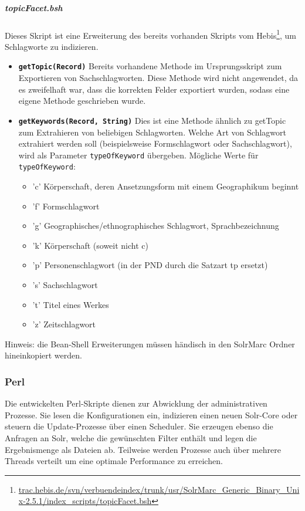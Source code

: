 \documentclass[10pt]{article}
\begin{document}
\subparagraph{topicFacet.bsh}
\label{sec:subpara:topicFacet}
Dieses Skript ist eine Erweiterung des bereits vorhanden Skripts vom Hebis\footnote{\url{trac.hebis.de/svn/verbuendeindex/trunk/usr/SolrMarc_Generic_Binary_Unix-2.5.1/index_scripts/topicFacet.bsh}}, um Schlagworte zu indizieren. 
\begin{itemize}
	\item \textbf{\texttt{getTopic(Record)}} Bereits vorhandene Methode im Ursprungsskript zum Exportieren von Sachschlagworten. Diese Methode wird nicht angewendet, da es zweifelhaft war, dass die korrekten Felder exportiert wurden, sodass eine eigene Methode geschrieben wurde.
	\item \textbf{\texttt{getKeywords(Record, String)}} Dies ist eine Methode ähnlich zu getTopic zum Extrahieren von beliebigen Schlagworten. Welche Art von Schlagwort extrahiert werden soll (beispielsweise Formschlagwort oder Sachschlagwort), wird als Parameter \texttt{typeOfKeyword} übergeben. Mögliche Werte für \texttt{typeOfKeyword}:
	\begin{itemize}
		\item 'c' Körperschaft, deren Ansetzungsform mit einem Geographikum beginnt 
		\item 'f' Formschlagwort 
		\item 'g' Geographisches/ethnographisches Schlagwort, Sprachbezeichnung 
		\item 'k' Körperschaft (soweit nicht c) 
		\item 'p' Personenschlagwort (in der PND durch die Satzart tp ersetzt) 
		\item 's' Sachschlagwort 
		\item 't' Titel eines Werkes 
		\item 'z' Zeitschlagwort 
	\end{itemize}
\end{itemize}
Hinweis: die Bean-Shell Erweiterungen müssen händisch in den SolrMarc Ordner hineinkopiert werden. 

\subsubsection{Perl}
Die entwickelten Perl-Skripte dienen zur Abwicklung der administrativen Prozesse. Sie lesen die Konfigurationen ein, indizieren einen neuen Solr-Core oder steuern die Update-Prozesse über einen Scheduler. Sie erzeugen ebenso die Anfragen an Solr, welche die gewünschten Filter enthält und legen die Ergebnismenge als Dateien ab. Teilweise werden Prozesse auch über mehrere Threads verteilt um eine optimale Performance zu erreichen.
\end{document}

